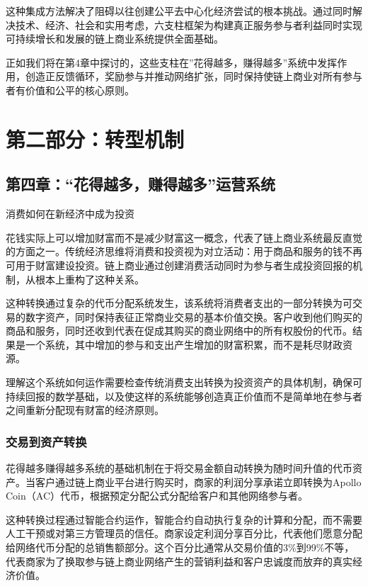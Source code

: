 \documentclass[
  Letterpaper,
]{scrbook}
\begin{document}
这种集成方法解决了阻碍以往创建公平去中心化经济尝试的根本挑战。通过同时解决技术、经济、社会和实用考虑，六支柱框架为构建真正服务参与者利益同时实现可持续增长和发展的链上商业系统提供全面基础。

正如我们将在第4章中探讨的，这些支柱在''花得越多，赚得越多''系统中发挥作用，创造正反馈循环，奖励参与并推动网络扩张，同时保持使链上商业对所有参与者有价值和公平的核心原则。

\part{第二部分：转型机制}

\chapter{第四章：``花得越多，赚得越多''运营系统}\label{sec-spend-earn-system}

消费如何在新经济中成为投资

花钱实际上可以增加财富而不是减少财富这一概念，代表了链上商业系统最反直觉的方面之一。传统经济思维将消费和投资视为对立活动：用于商品和服务的钱不再可用于财富建设投资。链上商业通过创建消费活动同时为参与者生成投资回报的机制，从根本上重构了这种关系。

这种转换通过复杂的代币分配系统发生，该系统将消费者支出的一部分转换为可交易的数字资产，同时保持表征正常商业交易的基本价值交换。客户收到他们购买的商品和服务，同时还收到代表在促成其购买的商业网络中的所有权股份的代币。结果是一个系统，其中增加的参与和支出产生增加的财富积累，而不是耗尽财政资源。

理解这个系统如何运作需要检查传统消费支出转换为投资资产的具体机制，确保可持续回报的数学基础，以及使这样的系统能够创造真正价值而不是简单地在参与者之间重新分配现有财富的经济原则。

\section{交易到资产转换}\label{ux4ea4ux6613ux5230ux8d44ux4ea7ux8f6cux6362}

花得越多赚得越多系统的基础机制在于将交易金额自动转换为随时间升值的代币资产。当客户通过链上商业平台进行购买时，商家的利润分享承诺立即转换为Apollo
Coin（AC）代币，根据预定分配公式分配给客户和其他网络参与者。

这种转换过程通过智能合约运作，智能合约自动执行复杂的计算和分配，而不需要人工干预或对第三方管理员的信任。商家设定利润分享百分比，代表他们愿意分配给网络代币分配的总销售额部分。这个百分比通常从交易价值的3\%到99\%不等，代表商家为了换取参与链上商业网络产生的营销利益和客户忠诚度而放弃的真实经济价值。
\end{document}
